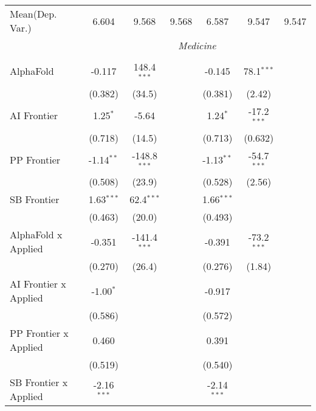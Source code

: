 \begin{tabular}{lcccccc}
Mean(Dep. Var.) & 6.604 & 9.568 & 9.568 & 6.587 & 9.547 & 9.547 \\
 & \multicolumn{6}{c}{\textit{Medicine}} \\ \\
   AlphaFold                    & -0.117        & 148.4$^{***}$  &                & -0.145        & 78.1$^{***}$  &   \\   
                                & (0.382)       & (34.5)         &                & (0.381)       & (2.42)        &   \\   
   AI Frontier                  & 1.25$^{*}$    & -5.64          &                & 1.24$^{*}$    & -17.2$^{***}$ &   \\   
                                & (0.718)       & (14.5)         &                & (0.713)       & (0.632)       &   \\   
   PP Frontier                  & -1.14$^{**}$  & -148.8$^{***}$ &                & -1.13$^{**}$  & -54.7$^{***}$ &   \\   
                                & (0.508)       & (23.9)         &                & (0.528)       & (2.56)        &   \\   
   SB Frontier                  & 1.63$^{***}$  & 62.4$^{***}$   &                & 1.66$^{***}$  &               &   \\   
                                & (0.463)       & (20.0)         &                & (0.493)       &               &   \\   
   AlphaFold x Applied          & -0.351        & -141.4$^{***}$ &                & -0.391        & -73.2$^{***}$ &   \\   
                                & (0.270)       & (26.4)         &                & (0.276)       & (1.84)        &   \\   
   AI Frontier x Applied        & -1.00$^{*}$   &                &                & -0.917        &               &   \\   
                                & (0.586)       &                &                & (0.572)       &               &   \\   
   PP Frontier x Applied        & 0.460         &                &                & 0.391         &               &   \\   
                                & (0.519)       &                &                & (0.540)       &               &   \\   
   SB Frontier x Applied        & -2.16$^{***}$ &                &                & -2.14$^{***}$ &               &   \\   

\end{tabular}
